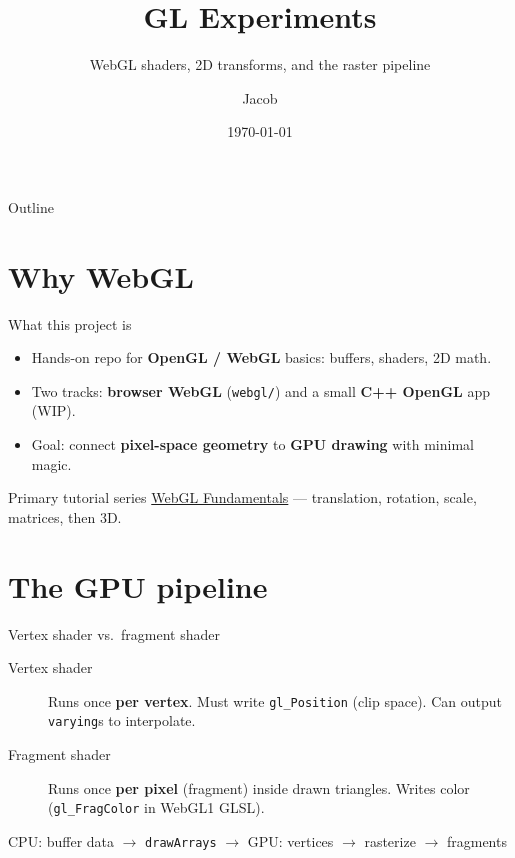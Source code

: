 \documentclass[aspectratio=169]{beamer}
\title{GL Experiments}
\subtitle{WebGL shaders, 2D transforms, and the raster pipeline}
\author{Jacob}
\date{\today}
\begin{document}
\begin{frame}
  \titlepage
\end{frame}

\begin{frame}{Outline}
  \tableofcontents
\end{frame}

\section{Why WebGL}

\begin{frame}{What this project is}
  \begin{itemize}
    \item Hands-on repo for \textbf{OpenGL / WebGL} basics: buffers, shaders, 2D math.
    \item Two tracks: \textbf{browser WebGL} (\texttt{webgl/}) and a small \textbf{C++ OpenGL} app (WIP).
    \item Goal: connect \textbf{pixel-space geometry} to \textbf{GPU drawing} with minimal magic.
  \end{itemize}
  \vfill
  \begin{block}{Primary tutorial series}
    \href{https://webglfundamentals.org/}{WebGL Fundamentals} — translation, rotation, scale, matrices, then 3D.
  \end{block}
\end{frame}

\section{The GPU pipeline}

\begin{frame}{Vertex shader vs.\ fragment shader}
  \begin{description}
    \item[Vertex shader] Runs once \textbf{per vertex}. Must write \texttt{gl\_Position} (clip space). Can output \texttt{varying}s to interpolate.
    \item[Fragment shader] Runs once \textbf{per pixel} (fragment) inside drawn triangles. Writes color (\texttt{gl\_FragColor} in WebGL1 GLSL).
  \end{description}
  \vfill
  \centering
  \small
  CPU: buffer data $\rightarrow$ \texttt{drawArrays} $\rightarrow$ GPU: vertices $\rightarrow$ rasterize $\rightarrow$ fragments
\end{frame}
\end{document}
